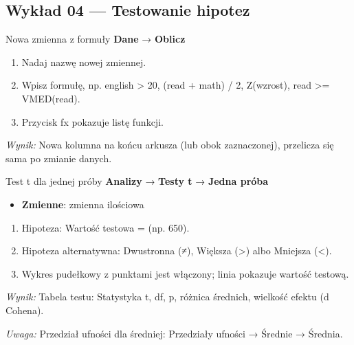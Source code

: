 \documentclass[
  polish,
  10pt,
  a4paper,
  DIV=11,
  numbers=noendperiod]{scrartcl}
\newcommand{\jmenu}[1]{{\color{upwraccent}\small #1}}
\begin{document}

\subsection{Wykład 04 --- Testowanie
hipotez}\label{wykux142ad-04-testowanie-hipotez}

\begin{jbox}{Nowa zmienna z formuły}\label{w:oblicz-zmienna}
\jmenu{\textbf{Dane} → \textbf{Oblicz}}

\begin{enumerate}
\item Nadaj nazwę nowej zmiennej.
\item Wpisz formułę, np. english \textgreater{} 20, (read + math) / 2, Z(wzrost), read \textgreater{}= VMED(read).
\item Przycisk fx pokazuje listę funkcji.
\end{enumerate}
\textit{Wynik:} Nowa kolumna na końcu arkusza (lub obok zaznaczonej), przelicza się sama po zmianie danych.

\end{jbox}

\begin{jbox}{Test t dla jednej próby}\label{w:t-jedna-proba}
\jmenu{\textbf{Analizy} → \textbf{Testy t} → \textbf{Jedna próba}}

\begin{itemize}
\item[$\triangleright$] \textbf{Zmienne}: zmienna ilościowa
\end{itemize}
\begin{enumerate}
\item Hipoteza: Wartość testowa = (np. 650).
\item Hipoteza alternatywna: Dwustronna (≠), Większa (\textgreater{}) albo Mniejsza (\textless{}).
\item Wykres pudełkowy z punktami jest włączony; linia pokazuje wartość testową.
\end{enumerate}
\textit{Wynik:} Tabela testu: Statystyka t, df, p, różnica średnich, wielkość efektu (d Cohena).

{\color{upwrsoft}\small\textit{Uwaga:} Przedział ufności dla średniej: Przedziały ufności → Średnie → Średnia.}
\end{jbox}
\end{document}
